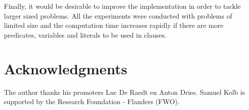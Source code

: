 \documentclass[letterpaper]{article}
\theoremstyle{definition}
\begin{document}
Finally, it would be desirable to improve the implementation in order to tackle larger sized problems.
All the experiments were conducted with problems of limited size and the computation time increases rapidly if there are more predicates, variables and literals to be used in clauses.

\section*{Acknowledgments}
The author thanks his promoters Luc De Raedt en Anton Dries.
Samuel Kolb is supported by the Research Foundation - Flanders (FWO).

%
%


\end{document}
